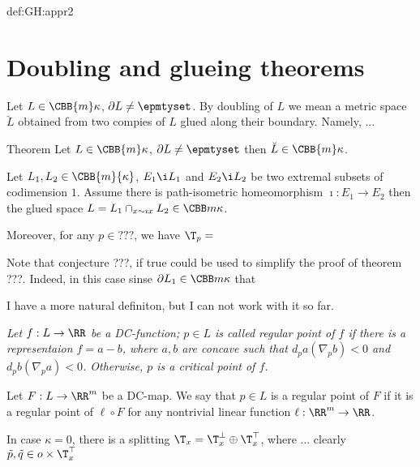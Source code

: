 {\begin{subthm}{def:GH:appr2}
\section{Doubling and glueing theorems}

Let $L\in\CBB{m}\kappa$, $\partial L\not=\epmtyset$.
By doubling of $L$ we mean a metric space $\breve{L}$ obtained from two compies of $L$ glued along their boundary.
Namely, ...

\begin{thm}{Theorem}
Let $L\in\CBB{m}\kappa$, $\partial L\not=\epmtyset$ then $\breve{L}\in \CBB{m}\kappa$.

\end{thm}
 

\begin{thm}
Let $L_1,L_2\in\CBB{m}{\kappa}$, $E_1\i L_1$ and $E_2\i L_2$ be two extremal subsets of codimension $1$.
Assume there is path-isometric homeomorphism $\imath:E_1\to E_2$ then the glued space
$L=L_1\cap_{x\sim\imath x}L_2\in \CBB m\kappa$.

Moreover, for any $p\in ???$, we have $\T_p=$
\end{thm}

Note that conjecture ???, if true could be used to simplify the proof of theorem ???.
Indeed, in this case sinse $\partial L_1\in \CBB m\kappa$ that  













{\small I have a more natural definiton, but I can not work with it so far.

{\it Let $f:L\to\RR$ be a DC-function;
 $p\in L$ is called regular point of $f$ if there is a representaion $f=a-b$, where $a,b$ are concave such that $d_pa(\nabla_pb)<0$ and $d_pb(\nabla_pa)<0$.
Otherwise, $p$ is a critical point of $f$.

Let $F:L\to\RR^m$ be a DC-map. 
We say that $p\in L$ is a regular point of $F$ if it is a regular point of $\ell\circ F$ for any nontrivial linear function $\ell:\RR^m\to\RR$.}}











In case $\kappa=0$, there is a splitting $\T_x=\T_x^\perp\oplus\T_x^\top$, where ...
clearly $\tilde p, \tilde q\in o\times\T_x^\top $


\end{subthm}}
